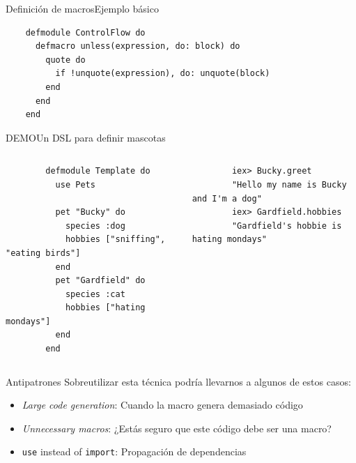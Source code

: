\documentclass[14pt,aspectratio=169]{beamer}
\begin{document}
\begin{frame}[fragile]{Definición de macros}{Ejemplo básico}
  \begin{verbatim}
    defmodule ControlFlow do
      defmacro unless(expression, do: block) do
        quote do
          if !unquote(expression), do: unquote(block)
        end
      end
    end
  \end{verbatim}
\end{frame}

\begin{frame}[fragile]{DEMO}{Un DSL para definir mascotas}
  \begin{columns}
    \begin{column}{0.5\textwidth}
      \scriptsize\begin{verbatim}
        defmodule Template do
          use Pets

          pet "Bucky" do
            species :dog
            hobbies ["sniffing", "eating birds"]
          end
          pet "Gardfield" do
            species :cat
            hobbies ["hating mondays"]
          end
        end
      \end{verbatim}
    \end{column}
    \begin{column}{0.5\textwidth}
      \scriptsize\begin{verbatim}
        iex> Bucky.greet
        "Hello my name is Bucky and I'm a dog"
        iex> Gardfield.hobbies
        "Gardfield's hobbie is hating mondays"
      \end{verbatim}
    \end{column}
  \end{columns}
\end{frame}

\begin{frame}{Antipatrones}
  Sobreutilizar esta técnica podría llevarnos a algunos de estos casos\footnotemark[3]:
  \begin{itemize}
    \item \textit{Large code generation}: Cuando la macro genera demasiado código
    \item \textit{Unnecessary macros}: ¿Estás seguro que este código debe ser una macro?
    \item \texttt{use} instead of \texttt{import}: Propagación de dependencias
  \end{itemize}
\end{frame}
\end{document}
